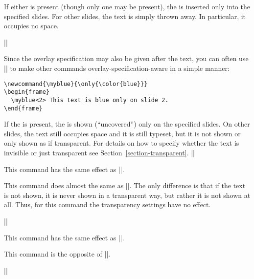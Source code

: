 \begin{command}{\only{}}
  If either  is present (though only one
  may be present), the  is inserted only into the specified
  slides. For other slides, the text is simply thrown away. In
  particular, it occupies no space.

  \example ||

  Since the overlay specification may also be given after the text,
  you can often use |\only| to make other commands
  overlay-specification-aware in a simple manner:

  \example
\begin{verbatim}
\newcommand{\myblue}{\only{\color{blue}}}
\begin{frame}
  \myblue<2> This text is blue only on slide 2.
\end{frame}
\end{verbatim}
\end{command}


\begin{command}{\uncover{}}
  If the  is present, the  is
  shown (``uncovered'') only on the specified slides. On other slides, the
  text still occupies space and it is still typeset, but it is not
  shown or only shown as if transparent. For details on how to specify
  whether the text is invisible or just transparent see
  Section~\ref{section-transparent}.
  \example ||

  \articlenote
  This command has the same effect as |\only|.
\end{command}

\begin{command}{\visible{}}
  This command does almost the same as |\uncover|. The only difference
  is that if the text is not shown, it is never shown in a transparent
  way, but rather it is not shown at all. Thus, for this command the
  transparency settings have no effect.

  \example ||

  \articlenote
  This command has the same effect as |\only|.
\end{command}

\begin{command}{\invisible{}}
  This command is the opposite of |\visible|.

  \example ||
\end{command}

